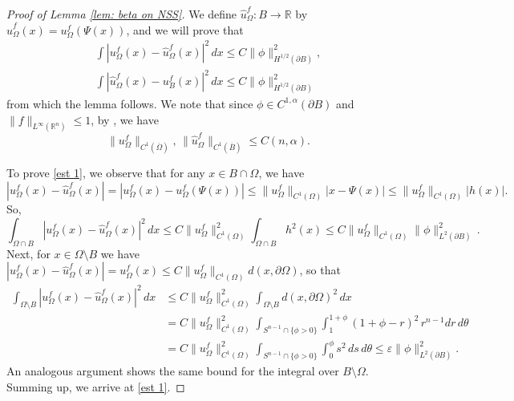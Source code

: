 \documentclass[10pt,a4paper]{amsart}
\numberwithin{equation}{section}
\def\R{{\mathbb R}}
\def\e{\varepsilon}
\def\W{\Omega}
\begin{document}
\begin{proof}[Proof of Lemma \ref{lem: beta on NSS}]	
	We define $\hat{u}^f_\W : B\to \R$ by $\hat{u}^f_\W (x) = u^f_\W(\Psi(x))$, and we will prove that 
	\begin{align}
	\label{est 1}	\int |u^f_{\W}(x) - \hat{u}^f_\W (x)|^2 \,dx \leq C \| \phi \|_{H^{1/2}(\partial B)}^2,\\
	\label{est 2}	\int | \hat{u}^f_\W(x) - u^f_B(x)|^2 \, dx \leq C \| \phi \|_{H^{1/2} (\partial B)}^2
	\end{align}
	from which the lemma follows. We note that since $\phi \in C^{1,\alpha}(\partial B)$ and $\| f\|_{L^\infty(\R^n)} \leq 1$, by \cite[Theorem 8.33]{GT}, we have 
    \begin{equation} \label{e:c1est}
       \| u^f_{\W} \|_{C^1(\overline{\W})} , \, \| \hat{u}^f_{\W} \|_{C^1(\overline{B})}
       \leq C(n,\alpha). 
    \end{equation}

 
	
	To prove \eqref{est 1}, we observe that for any $x \in B\cap \W$, we have
	\[
	|u^f_\W(x) - \hat{u}^f_\W(x)| =|u^f_\W(x) - u^f_\W(\Psi(x))|\leq \| u^f_\W\|_{C^1(\W)} | x- \Psi(x)| \le  \| u^f_\W\|_{C^1(\W)} |h(x)|.
	\]
	So, 
	\[
	\int_{\W \cap B}|u^f_\W(x) - \hat{u}^f_\W(x)|^2 \,dx \leq C\| u^f_\W\|^2_{C^1(\W)}  \int_{\W \cap B} h^2(x) \leq  C\| u^f_\W\|_{C^1(\W)}  \| \phi \|_{L^2(\partial B)}^2\,.
	\]
	 Next, for $x \in \W\setminus B$ we have $|u^f_\W(x) - \hat{u}^f_\W(x)| = u^f_\W(x) \leq C\| u^f_\W\|_{C^1(\W)} d(x, \partial \W)$, so that 
	\begin{align*}
		\int_{\W \setminus B} |u^f_\W(x) - \hat{u}^f_\W(x)|^2 \,dx  & \leq C\| u^f_\W\|^2_{C^1(\W)}  \int_{\W \setminus B} d(x, \partial \W)^2 \, dx\\
		 &= C\| u^f_\W\|^2_{C^1(\W)}  \int_{S^{n-1} \cap \{ \phi>0\}} \int_1^{1+ \phi} (1+\phi -r)^2 \,r^{n-1} dr \, d\theta \\
		&=C\| u^f_\W\|^2_{C^1(\W)}  \int_{S^{n-1} \cap \{ \phi>0\}} \int_{0}^\phi s^2 \, ds \, d\theta  \leq \e \| \phi\|_{L^2(\partial B)}^2.
	\end{align*}
	An analogous argument shows the same bound for the integral over $B\setminus \W$. Summing up, we arrive at \eqref{est 1}.
	

\end{proof}
\end{document}

